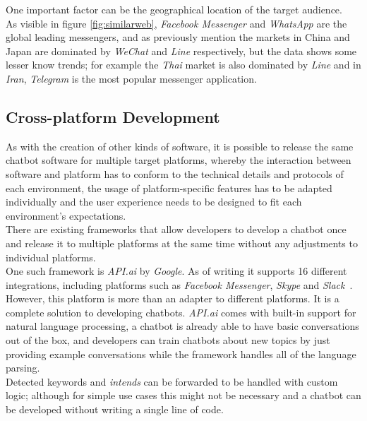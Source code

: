 \label{geography}

One important factor can be the geographical location of the target audience.
\\
As visible in figure \ref{fig:similarweb}, \emph{Facebook Messenger} and \emph{WhatsApp} are the global leading messengers,
and as previously mention the markets in China and Japan are dominated by \emph{WeChat} and \emph{Line} respectively,
but the data shows some lesser know trends; for example the \emph{Thai} market is also dominated by \emph{Line}
and in \emph{Iran}, \emph{Telegram} is the most popular messenger application.


\subsection{Cross-platform Development}
\label{crossplatform}

As with the creation of other kinds of software, it is possible to release the same chatbot software for multiple target platforms,
whereby the interaction between software and platform has to conform to the technical details and protocols of each environment, the usage of platform-specific features has to be adapted individually and the user experience needs to be designed to fit each environment's expectations.
\\

There are existing frameworks that allow developers to develop a chatbot once and release it to multiple platforms at the same time without any adjustments to individual platforms.
\\
One such framework is \emph{API.ai} by \emph{Google}.
As of writing it supports 16 different integrations, including platforms such as \emph{Facebook Messenger}, \emph{Skype} and \emph{Slack}~\cite{apiai}.
However, this platform is more than an adapter to different platforms.
It is a complete solution to developing chatbots.
\emph{API.ai} comes with built-in support for natural language processing,
a chatbot is already able to have basic conversations out of the box,
and developers can train chatbots about new topics by just providing example conversations while the framework handles all of the language parsing.
\\
Detected keywords and \emph{intends} can be forwarded to be handled with custom logic;
although for simple use cases this might not be necessary and a chatbot can be developed without writing a single line of code.
\\

